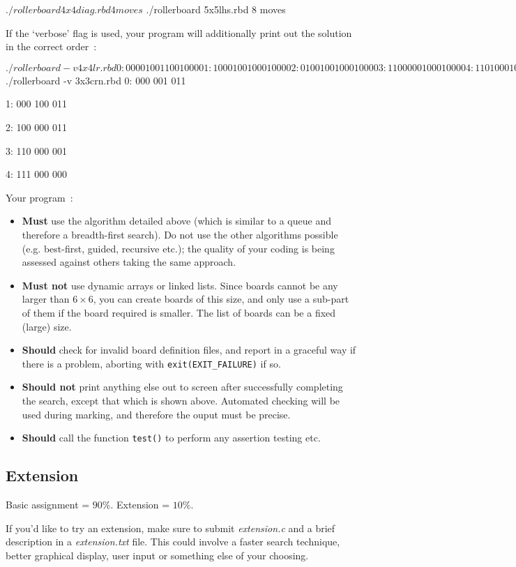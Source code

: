\begin{exercise}
\begin{terminaloutput}
$ ./rollerboard 4x4diag.rbd
4 moves
$ ./rollerboard 5x5lhs.rbd
8 moves
\end{terminaloutput}


If the `verbose' flag is used, your program will additionally print out the solution in the correct order~:
\begin{terminaloutput}
$ ./rollerboard -v 4x4lr.rbd
0:
0000
1001
1001
0000

1:
1000
1001
0001
0000

2:
0100
1001
0001
0000

3:
1100
0001
0001
0000

4:
1101
0001
0000
0000

5:
1110
0001
0000
0000

6:
1111
0000
0000
0000 

$ ./rollerboard -v 3x3crn.rbd
0:
000
001
011

1:
000
100
011

2:
100
000
011

3:
110
000
001

4:
111
000
000

\end{terminaloutput}

\noindent
Your program~:
\begin{itemize}
\item {\bf Must} use the algorithm detailed above (which is similar to a queue and therefore a breadth-first search). Do not use the other algorithms possible (e.g. best-first, guided, recursive etc.); the quality of your coding is being assessed against others taking the same approach.
\item {\bf Must not} use dynamic arrays or linked lists. Since boards cannot be any larger than $6 \times 6$, you can create boards of this size, and only use a sub-part of them if the board required is smaller. The list of boards can be a fixed (large) size.
\item {\bf Should} check for invalid board definition files, and report in a graceful way if there is a problem, aborting with \verb^exit(EXIT_FAILURE)^ if so.
\item {\bf Should not} print anything else out to screen after successfully
completing the search, except that which is shown above. Automated checking
will be used during marking, and therefore the ouput must be precise.
\item {\bf Should} call the function \verb^test()^ to perform any assertion testing etc.
\end{itemize}


\subsection*{Extension}

Basic assignment = {\Large $90\%$}.
Extension = {\Large $10\%$}.

\noindent
If you'd like to try an extension, make sure to submit {\it extension.c}
and a brief description in a {\it extension.txt} file. This could
involve a faster search technique, better graphical display, user input
or something else of your choosing.

\end{exercise}
